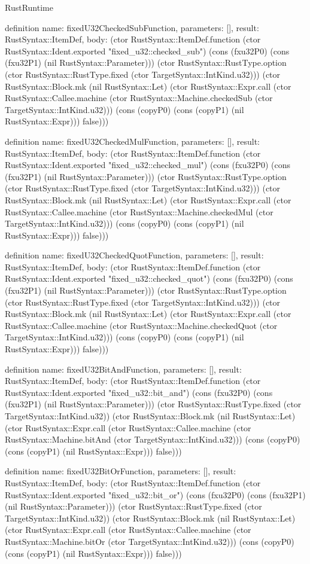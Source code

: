 \begin{lexlean}{RustRuntime}
\begin{semanticmodule}
definition{
  name: fixedU32CheckedSubFunction,
  parameters: [],
  result: RustSyntax::ItemDef,
  body: (ctor RustSyntax::ItemDef.function (ctor RustSyntax::Ident.exported "fixed_u32::checked_sub") (cons (fxu32P0) (cons (fxu32P1) (nil RustSyntax::Parameter))) (ctor RustSyntax::RustType.option (ctor RustSyntax::RustType.fixed (ctor TargetSyntax::IntKind.u32))) (ctor RustSyntax::Block.mk (nil RustSyntax::Let) (ctor RustSyntax::Expr.call (ctor RustSyntax::Callee.machine (ctor RustSyntax::Machine.checkedSub (ctor TargetSyntax::IntKind.u32))) (cons (copyP0) (cons (copyP1) (nil RustSyntax::Expr))) false)))
}

definition{
  name: fixedU32CheckedMulFunction,
  parameters: [],
  result: RustSyntax::ItemDef,
  body: (ctor RustSyntax::ItemDef.function (ctor RustSyntax::Ident.exported "fixed_u32::checked_mul") (cons (fxu32P0) (cons (fxu32P1) (nil RustSyntax::Parameter))) (ctor RustSyntax::RustType.option (ctor RustSyntax::RustType.fixed (ctor TargetSyntax::IntKind.u32))) (ctor RustSyntax::Block.mk (nil RustSyntax::Let) (ctor RustSyntax::Expr.call (ctor RustSyntax::Callee.machine (ctor RustSyntax::Machine.checkedMul (ctor TargetSyntax::IntKind.u32))) (cons (copyP0) (cons (copyP1) (nil RustSyntax::Expr))) false)))
}

definition{
  name: fixedU32CheckedQuotFunction,
  parameters: [],
  result: RustSyntax::ItemDef,
  body: (ctor RustSyntax::ItemDef.function (ctor RustSyntax::Ident.exported "fixed_u32::checked_quot") (cons (fxu32P0) (cons (fxu32P1) (nil RustSyntax::Parameter))) (ctor RustSyntax::RustType.option (ctor RustSyntax::RustType.fixed (ctor TargetSyntax::IntKind.u32))) (ctor RustSyntax::Block.mk (nil RustSyntax::Let) (ctor RustSyntax::Expr.call (ctor RustSyntax::Callee.machine (ctor RustSyntax::Machine.checkedQuot (ctor TargetSyntax::IntKind.u32))) (cons (copyP0) (cons (copyP1) (nil RustSyntax::Expr))) false)))
}

definition{
  name: fixedU32BitAndFunction,
  parameters: [],
  result: RustSyntax::ItemDef,
  body: (ctor RustSyntax::ItemDef.function (ctor RustSyntax::Ident.exported "fixed_u32::bit_and") (cons (fxu32P0) (cons (fxu32P1) (nil RustSyntax::Parameter))) (ctor RustSyntax::RustType.fixed (ctor TargetSyntax::IntKind.u32)) (ctor RustSyntax::Block.mk (nil RustSyntax::Let) (ctor RustSyntax::Expr.call (ctor RustSyntax::Callee.machine (ctor RustSyntax::Machine.bitAnd (ctor TargetSyntax::IntKind.u32))) (cons (copyP0) (cons (copyP1) (nil RustSyntax::Expr))) false)))
}

definition{
  name: fixedU32BitOrFunction,
  parameters: [],
  result: RustSyntax::ItemDef,
  body: (ctor RustSyntax::ItemDef.function (ctor RustSyntax::Ident.exported "fixed_u32::bit_or") (cons (fxu32P0) (cons (fxu32P1) (nil RustSyntax::Parameter))) (ctor RustSyntax::RustType.fixed (ctor TargetSyntax::IntKind.u32)) (ctor RustSyntax::Block.mk (nil RustSyntax::Let) (ctor RustSyntax::Expr.call (ctor RustSyntax::Callee.machine (ctor RustSyntax::Machine.bitOr (ctor TargetSyntax::IntKind.u32))) (cons (copyP0) (cons (copyP1) (nil RustSyntax::Expr))) false)))
}


\end{semanticmodule}
\end{lexlean}
